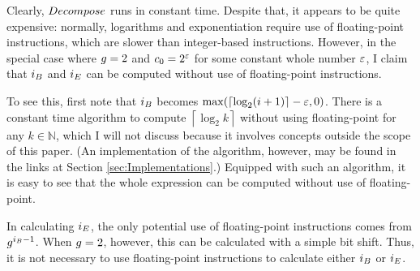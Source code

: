 Clearly, $Decompose$ runs in constant time. Despite that, it appears to be quite expensive: normally, logarithms and exponentiation require use of floating-point instructions, which are slower than integer-based instructions. However, in the special case where $g = 2$ and $c_0 = 2^\varepsilon$ for some constant whole number $\varepsilon$, I claim that $i_B$ and $i_E$ can be computed without use of floating-point instructions.

To see this, first note that $i_B$ becomes $\max(\left\lceil \log_2 (i + 1) \right\rceil - \varepsilon, 0)$. There is a constant time algorithm to compute $\left\lceil \log_2 k \right\rceil$ without using floating-point for any $k \in \mathbb{N}$, which I will not discuss because it involves concepts outside the scope of this paper. (An implementation of the algorithm, however, may be found in the links at Section \ref{sec:Implementations}.) Equipped with such an algorithm, it is easy to see that the whole expression can be computed without use of floating-point.

In calculating $i_E$, the only potential use of floating-point instructions comes from $g^{i_B - 1}$. When $g = 2$, however, this can be calculated with a simple bit shift. Thus, it is not necessary to use floating-point instructions to calculate either $i_B$ or $i_E$.